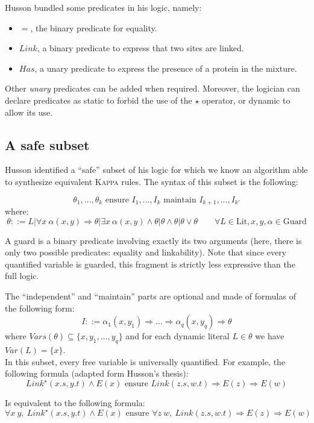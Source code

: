 \documentclass[10pt,a4paper]{article}
\newcommand\Kappa{\textsc{Kappa}}
\begin{document}
Husson bundled some predicates in his logic, namely:
\begin{itemize}
\item $=$, the binary predicate for equality.
\item $Link$, a binary predicate to express that two sites are linked.
\item $Has$, a unary predicate to express the presence of a protein in the mixture.
\end{itemize}

Other \emph{unary} predicates can be added when required. Moreover, the logician can declare predicates as static to forbid the use of the $\star$ operator, or dynamic to allow its use.

\subsection{A safe subset}
Husson identified a ``safe'' subset of his logic for which we know an algorithm able to synthesize equivalent \Kappa{} rules. The syntax of this subset is the following\cite{husson}:
\label{hussonsyntax}

$$ \theta_1,... ,\theta_k \text{ ensure } I_1,...,I_k \text{ maintain } I_{k+1},...,I_{k'} $$
where:
$$ \theta ::= L | \forall x\ \alpha(x,y) \Rightarrow \theta | \exists x\ \alpha(x,y) \land \theta | \theta \land \theta | \theta \lor \theta \quad \quad \forall L \in \text{Lit},x,y,\alpha \in \text{Guard}$$

A guard is a binary predicate involving exactly its two arguments (here, there is only two possible predicates: equality and linkability). Note that since every quantified variable is guarded, this fragment is strictly less expressive than the full logic.

The ``independent'' and ``maintain'' parts are optional and made of formulas of the following form:
$$ I ::= \alpha_1(x,y_1) \Rightarrow ...\Rightarrow \alpha_q(x,y_q) \Rightarrow \theta $$
\label{criterion}
where $Vars(\theta) \subseteq \{x,y_1,...,y_q\}$ and for each dynamic literal $L \in \theta$ we have $Var(L) = \{x\}$.\\

In this subset, every free variable is universally quantified. For example, the following formula (adapted form Husson's thesis):
$$ Link^\star(x.s,y.t) \land E(x) \text{ ensure } Link(z.s,w.t) \Rightarrow E(z) \Rightarrow E(w) $$

Is equivalent to the following formula:
$$\forall x\ y,\ Link^\star(x.s,y.t) \land E(x) \text{ ensure } \forall z\ w,\ Link(z.s,w.t) \Rightarrow E(z) \Rightarrow E(w) $$
\end{document}
